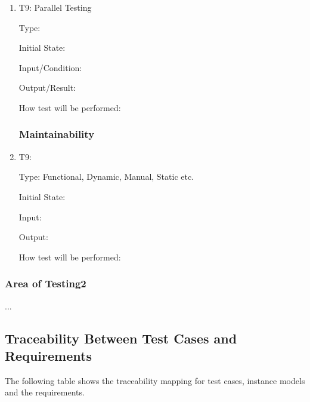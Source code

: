 \documentclass[12pt, titlepage]{article}
\begin{document}
\begin{enumerate}

\item{T9: Parallel Testing\\}


Type: 
					
Initial State: 
					
Input/Condition: 
					
Output/Result: 
					
How test will be performed: 
				
				
				
\subsubsection{Maintainability}				
					
\item{T9: \\}

Type: Functional, Dynamic, Manual, Static etc.
					
Initial State: 
					
Input: 
					
Output: 
					
How test will be performed: 




\end{enumerate}

\subsubsection{Area of Testing2}

...

\subsection{Traceability Between Test Cases and Requirements}

The following table shows the traceability mapping for test cases, instance models and the requirements. 
\end{document}
